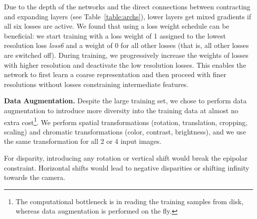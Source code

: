 \documentclass[10pt,twocolumn,letterpaper]{article}
\begin{document}
Due to the depth of the networks and the direct connections between contracting and expanding layers (see Table~\ref{table:archs}), lower layers get mixed gradients if all six losses are active. We found that using a loss weight schedule can be beneficial: we start training with a loss weight of 1 assigned to the lowest resolution loss \emph{loss6} and a weight of 0 for all other losses (that is, all other losses are switched off). During training, we progressively increase the weights of losses with higher resolution and deactivate the low resolution losses. This enables the network to first learn a coarse representation and then proceed with finer resolutions without losses constraining intermediate features.

\textbf{Data Augmentation.}
Despite the large training set, we chose to perform data augmentation to introduce more diversity into the training data at almost no extra cost\footnote{The computational bottleneck is in reading the training samples from disk, whereas data augmentation is performed on the fly.}.
We perform spatial transformations (rotation, translation, cropping, scaling) and chromatic transformations (color, contrast, brightness), and we use the same transformation for all 2 or 4 input images.

For disparity, introducing any rotation or vertical shift would break the epipolar constraint. Horizontal shifts would lead to negative disparities or shifting infinity towards the camera.
\end{document}
